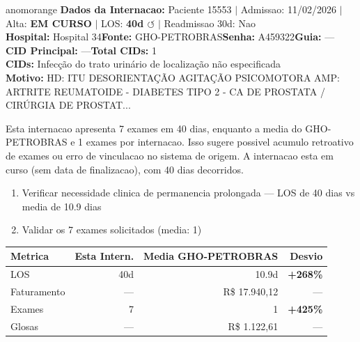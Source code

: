 \documentclass[a4paper,10pt]{article}
\begin{document}
\begin{anomalycard}[Internacao 165278 | GHO-PETROBRAS | ALTO (z=3.02)]{anomorange}
\textbf{Dados da Internacao:} Paciente 15553 $\mid$ Admissao: 11/02/2026 $\mid$ Alta: \textcolor{anomorange}{\textbf{EM CURSO}} $\mid$ LOS: \textbf{40d \textcolor{anomorange}{$\circlearrowleft$}} $\mid$ Readmissao 30d: Nao\\
\textbf{Hospital:} Hospital 34\quad\textbf{Fonte:} GHO-PETROBRAS\quad\textbf{Senha:} A459322\quad\textbf{Guia:} ---\\
\textbf{CID Principal:} {\small ---}\quad\textbf{Total CIDs:} 1\\

\textbf{CIDs:} {\scriptsize Infecção do trato urinário de localização não especificada}\\

\textbf{Motivo:} {\scriptsize HD: ITU DESORIENTAÇÃO  AGITAÇÃO PSICOMOTORA  AMP: ARTRITE REUMATOIDE - DIABETES TIPO 2 - CA DE PROSTATA / CIRÚRGIA DE PROSTAT...}\\

\vspace{2pt}\begin{tcolorbox}[colback=severityred!20,colframe=anomorange,title={\textbf{Interpretacao de Negocio}},fonttitle=\bfseries\small,left=4pt,right=4pt,top=3pt,bottom=3pt]
{\small Esta internacao apresenta 7 exames em 40 dias, enquanto a media do GHO-PETROBRAS e 1 exames por internacao. Isso sugere possivel acumulo retroativo de exames ou erro de vinculacao no sistema de origem. A internacao esta em curso (sem data de finalizacao), com 40 dias decorridos.}
\end{tcolorbox}
\begin{tcolorbox}[colback=severityyellow!30,colframe=anomorange,title={\textbf{Recomendacoes Especificas}},fonttitle=\bfseries\small,left=4pt,right=4pt,top=3pt,bottom=3pt]
\begin{enumerate}[nosep,leftmargin=16pt]
\item {\small Verificar necessidade clinica de permanencia prolongada --- LOS de 40 dias vs media de 10.9 dias}
\item {\small Validar os 7 exames solicitados (media: 1)}
\end{enumerate}
\end{tcolorbox}
\begin{center}\begin{tabular}{l r r r}\toprule\textbf{Metrica} & \textbf{Esta Intern.} & \textbf{Media GHO-PETROBRAS} & \textbf{Desvio} \\\midrule
LOS & 40d & 10.9d & \textcolor{anomred}{\textbf{+268\%}} \\
Faturamento & --- & R\$ 17.940,12 & --- \\
Exames & 7 & 1 & \textcolor{anomred}{\textbf{+425\%}} \\
Glosas & --- & R\$ 1.122,61 & --- \\
\bottomrule\end{tabular}\end{center}


\end{anomalycard}
\end{document}
